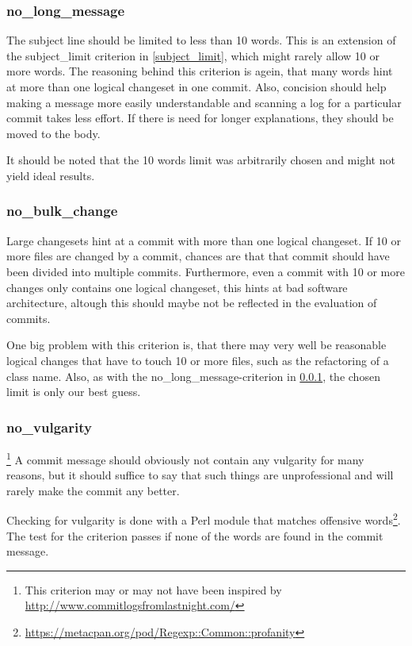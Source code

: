 \subsubsection{no\_long\_message}
\label{subs:no_long_message}
The subject line should be limited to less than 10 words. This is an extension of the subject\_limit criterion in \ref{subject_limit}, which might rarely allow 10 or more words. The reasoning behind this criterion is agein, that many words hint at more than one logical changeset in one commit. Also, concision should help making a message more easily understandable and scanning a log for a particular commit takes less effort. If there is need for longer explanations, they should be moved to the body.

It should be noted that the 10 words limit was arbitrarily chosen and might not yield ideal results.

\subsubsection{no\_bulk\_change}
\label{subs:no_bulk_change}
Large changesets hint at a commit with more than one logical changeset. If 10 or more files are changed by a commit, chances are that that commit should have been divided into multiple commits. Furthermore, even a commit with 10 or more changes only contains one logical changeset, this hints at bad software architecture, altough this should maybe not be reflected in the evaluation of commits.

One big problem with this criterion is, that there may very well be reasonable logical changes that have to touch 10 or more files, such as the refactoring of a class name. Also, as with the no\_long\_message-criterion in \ref{subs:no_long_message}, the chosen limit is only our best guess.

\subsubsection{no\_vulgarity}
\footnote{This criterion may or may not have been inspired by \url{http://www.commitlogsfromlastnight.com/}}
\label{subs:no_vulgarity}
A commit message should obviously not contain any vulgarity for many reasons, but it should suffice to say that such things are unprofessional and will rarely make the commit any better.

Checking for vulgarity is done with a Perl module that matches offensive words\footnote{\url{https://metacpan.org/pod/Regexp::Common::profanity}}. The test for the criterion passes if none of the words are found in the commit message.

